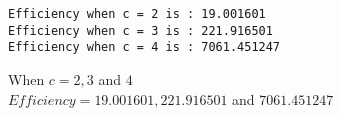 \documentclass[11pt]{article}
\begin{document}
    \begin{Verbatim}[commandchars=\\\{\}]
Efficiency when c = 2 is : 19.001601
Efficiency when c = 3 is : 221.916501
Efficiency when c = 4 is : 7061.451247

    \end{Verbatim}

    When \(c= 2,3\) and \(4\)\\
\(Efficiency = 19.001601,221.916501\) and \(7061.451247\)


    
    
    
    
\end{document}
